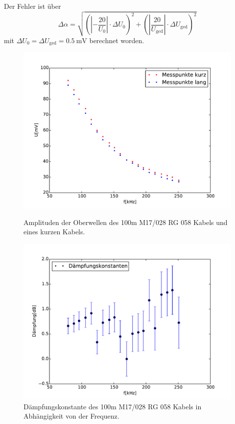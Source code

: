 Der Fehler ist über
\begin{equation*}
	\Delta \alpha = \sqrt{\left(|-\frac{20}{U_0}|\cdot \Delta U_0\right)^2 + \left(|\frac{20}{U_\text{ged}}|\cdot \Delta U_\text{ged}\right)^2}
\end{equation*}
mit $\Delta U_0 = \Delta U_\text{ged} = \SI{0.5}{\milli\volt}$ berechnet worden.

\begin{figure}
	\centering
	\includegraphics[width = 14cm]{data/b/alpha_zeit.pdf}
	\caption[]{Amplituden der Oberwellen des 100m M17/028 RG 058 Kabels und eines kurzen Kabels.}
	\label{fig_daempf1}
	\includegraphics[width = 14cm]{data/b/alpha.pdf}
	\caption[]{Dämpfungskonstante des 100m M17/028 RG 058 Kabels in Abhängigkeit von der Frequenz.}
	\label{fig_daempf2}
\end{figure}

